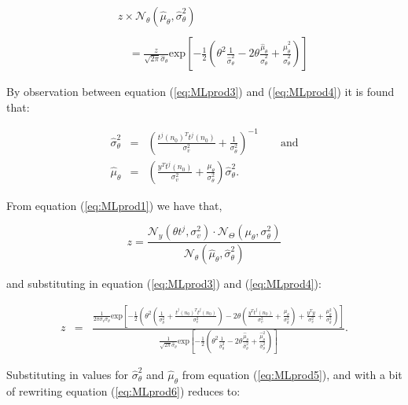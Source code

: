 \begin{eqnarray}\label{eq:MLprod4}
& & z \times \mathcal{N}_\theta(\hat{\mu}_\theta,\hat{\sigma}^2_\theta) \\\nonumber{}\\\nonumber
& & \quad = \frac{z}{\sqrt{2 \pi}\hat{\sigma}_\theta}\textrm{exp}\left[-\frac{1}{2}\left(\theta^2\frac{1}{\hat{\sigma}^2_\theta} - 2\theta\frac{\hat{\mu}_\theta}{\hat{\sigma}^2_\theta} + \frac{\hat{\mu}_\theta^2}{\hat{\sigma}^2_\theta}  \right)\right]
\end{eqnarray}

By observation between equation (\ref{eq:MLprod3}) and (\ref{eq:MLprod4}) it is found that:

\begin{eqnarray}
\label{eq:MLprod5}
\hat{\sigma}^2_\theta &=& \left(\frac{t^j(n_0)^T t^j(n_0)}{\sigma_v^2} + \frac{1}{\sigma_\theta^2}\right)^{-1} \qquad \textrm{and}\\\nonumber
\hat{\mu}_\theta &=& \left(\frac{y^T t^j(n_0)}{\sigma_v^2} + \frac{\mu_\theta}{\sigma^2_\theta}\right)\hat{\sigma}^2_\theta.
\end{eqnarray}

From equation (\ref{eq:MLprod1}) we have that,

\begin{equation}\label{eq:MLprod2}
z = \frac{\mathcal{N}_y(\theta t^j,\sigma_v^2)\cdot\mathcal{N}_\Theta(\mu_\theta,\sigma^2_\theta)}{\mathcal{N}_\theta(\hat{\mu}_\theta,\hat{\sigma}^2_\theta)}
\end{equation}

and substituting in equation (\ref{eq:MLprod3}) and (\ref{eq:MLprod4}):

\begin{eqnarray}\label{eq:MLprod6}
z &=& \frac{\frac{1}{2\pi \sigma_v \sigma_\theta} \textrm{exp}\left[-\frac{1}{2}\left(\theta^2 \left(\frac{1}{\sigma_\theta^2}+\frac{t^j(n_0)^T t^j(n_0)}{\sigma_v^2}\right) - 2\theta\left(\frac{y^T t^j(n_0)}{\sigma_v^2}+\frac{\mu_\theta}{\sigma_\theta^2}\right) + \frac{y^T y}{\sigma_v^2} +\frac{\mu_\theta^2}{\sigma_\theta^2}\right)\right]}{\frac{1}{\sqrt{2 \pi}\hat{\sigma}_\theta}\textrm{exp}\left[-\frac{1}{2}\left(\theta^2\frac{1}{\hat{\sigma}^2_\theta} - 2\theta\frac{\hat{\mu}_\theta}{\hat{\sigma}^2_\theta} + \frac{\hat{\mu}_\theta^2}{\hat{\sigma}^2_\theta}  \right)\right]}.
\end{eqnarray}

Substituting in values for $\hat{\sigma}^2_\theta$ and $\hat{\mu}_\theta$ from equation (\ref{eq:MLprod5}), and with a bit of rewriting equation (\ref{eq:MLprod6}) reduces to:

